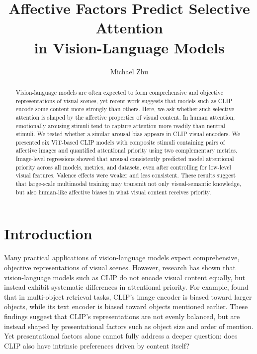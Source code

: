 \documentclass{article}
\title{Affective Factors Predict Selective Attention\\in Vision-Language Models}
\date{}
\author[1]{Michael Zhu}
\affil[1]{Master in Computational Social Science}
\begin{document}
\maketitle

\begin{abstract}
Vision-language models are often expected to form comprehensive and objective
representations of visual scenes, 
yet recent work suggests that models such as CLIP encode some content more strongly than others. 
Here, we ask whether such selective attention is shaped by the affective properties of visual content.
In human attention, emotionally arousing stimuli tend to capture attention more readily than neutral stimuli.
We tested whether a similar arousal bias appears in CLIP visual encoders. 
We presented six ViT-based CLIP models with composite stimuli containing pairs of affective images and quantified attentional priority using two complementary metrics. 
Image-level regressions showed that arousal consistently predicted model attentional priority across all models, metrics, and datasets, even after controlling for low-level visual features. 
Valence effects were weaker and less consistent.
These results suggest that large-scale multimodal training may transmit not
only visual-semantic knowledge, but also human-like affective biases in what
visual content receives priority.
\end{abstract}

\section{Introduction}
Many practical applications of vision-language models expect comprehensive, objective representations of visual scenes. However, research has shown that vision-language models such as CLIP do not encode visual content equally, but instead exhibit systematic differences in attentional priority. For example, \citet{abbasiCLIPMicroscopeFineGrained2025} found that in multi-object retrieval tasks, CLIP's image encoder is biased toward larger objects, while its text encoder is biased toward objects mentioned earlier. These findings suggest that CLIP's representations are not evenly balanced, but are instead shaped by presentational factors such as object size and order of mention. Yet presentational factors alone cannot fully address a deeper question: does CLIP also have intrinsic preferences driven by content itself? %
\end{document}
